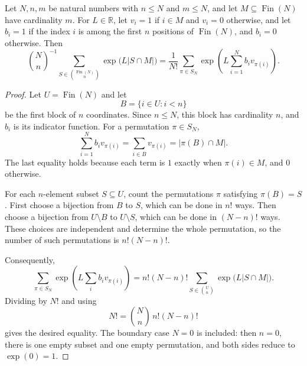\begin{helper}
Let \(N,n,m\) be natural numbers with \(n\le N\) and \(m\le N\), and let
\(M\subseteq \operatorname{Fin}(N)\) have cardinality \(m\).  For
\(L\in\mathbb R\), let \(v_i=1\) if \(i\in M\) and \(v_i=0\) otherwise,
and let \(b_i=1\) if the index \(i\) is among the first \(n\) positions
of \(\operatorname{Fin}(N)\), and \(b_i=0\) otherwise.  Then
\[
\binom Nn^{-1}\sum_{S\in\binom{\operatorname{Fin}(N)}n}
\exp\!\bigl(L|S\cap M|\bigr)
=\frac1{N!}\sum_{\pi\in S_N}
\exp\!\left(L\sum_{i=1}^N b_i v_{\pi(i)}\right).
\]
\end{helper}
\begin{proof}
Let \(U=\operatorname{Fin}(N)\) and let
\[
B=\{i\in U:i<n\}
\]
be the first block of \(n\) coordinates.  Since \(n\le N\), this block has
cardinality \(n\), and \(b_i\) is its indicator function.  For a permutation
\(\pi\in S_N\),
\[
\sum_{i=1}^N b_i v_{\pi(i)}
=\sum_{i\in B} v_{\pi(i)}
=|\pi(B)\cap M|.
\]
The last equality holds because each term is \(1\) exactly when
\(\pi(i)\in M\), and \(0\) otherwise.

For each \(n\)-element subset \(S\subseteq U\), count the permutations
\(\pi\) satisfying \(\pi(B)=S\).  First choose a bijection from \(B\) to
\(S\), which can be done in \(n!\) ways.  Then choose a bijection from
\(U\setminus B\) to \(U\setminus S\), which can be done in \((N-n)!\) ways.
These choices are independent and determine the whole permutation, so the
number of such permutations is \(n!(N-n)!\).

Consequently,
\[
\sum_{\pi\in S_N}
\exp\!\left(L\sum_i b_i v_{\pi(i)}\right)
=
n!(N-n)!
\sum_{S\in\binom Un}\exp\!\bigl(L|S\cap M|\bigr).
\]
Dividing by \(N!\) and using
\[
N!=\binom Nn\,n!(N-n)!
\]
gives the desired equality.  The boundary case \(N=0\) is included:
then \(n=0\), there is one empty subset and one empty permutation, and both
sides reduce to \(\exp(0)=1\).
\end{proof}
